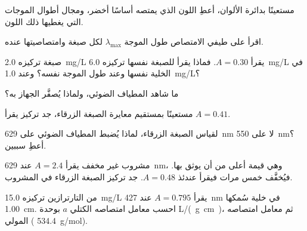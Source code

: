 \begin{exercise}[$\star$]\label{exo:g11:absorbance:2}
مستعينًا بدائرة الألوان، أعطِ اللون الذي يمتصه أساسًا  أخضر، ومجال أطوال
الموجات التي يغطيها ذلك اللون.
\end{exercise}

\begin{exercise}[$\star$]\label{exo:g11:absorbance:3}
اقرأ على طيفي الامتصاص طول الموجة $\lambda_{\max}$ لكل صبغة
وامتصاصيتها عنده.
\end{exercise}

\begin{exercise}[$\star$]\label{exo:g11:absorbance:4}
 صبغة تركيزه \qty{2.0}{mg/L} يقرأ $A = 0.30$. فماذا يقرأ  للصبغة
نفسها تركيزه \qty{6.0}{mg/L} في الخلية نفسها وعند طول الموجة
نفسه؟ وعند \qty{1.0}{mg/L}؟
\end{exercise}

\begin{exercise}[$\star$]\label{exo:g11:absorbance:5}
ما شاهد المطياف الضوئي، ولماذا يُصفَّر الجهاز
به؟
\end{exercise}

\begin{exercise}[$\star\star$]\label{exo:g11:absorbance:6}
مستعينًا بمستقيم معايرة الصبغة الزرقاء، جد تركيز  يقرأ
$A = 0.41$.
\end{exercise}

\begin{exercise}[$\star\star$]\label{exo:g11:absorbance:7}
لقياس الصبغة الزرقاء، لماذا يُضبط المطياف الضوئي على
\qty{629}{nm} لا على \qty{550}{nm}؟ أعطِ سببين.
\end{exercise}

\begin{exercise}[$\star\star$]\label{exo:g11:absorbance:8}
مشروب غير مخفف يقرأ $A = 2.4$ عند \qty{629}{nm}، وهي قيمة أعلى من أن يوثق بها.
فيُخفَّف خمس مرات فيقرأ عندئذ $A = 0.48$. جد تركيز الصبغة الزرقاء في
المشروب.
\end{exercise}

\begin{exercise}[$\star\star$]\label{exo:g11:absorbance:9}
 من التارترازين تركيزه \qty{15.0}{mg/L} يقرأ $A = 0.795$ عند
\qty{427}{nm} في خلية سُمكها \qty{1.00}{cm}. احسب معامل امتصاصه الكتلي $a$ بوحدة
\si{L/(g.cm)}، ثم معامل امتصاصه المولي (
\qty{534.4}{g/mol}).
\end{exercise}


